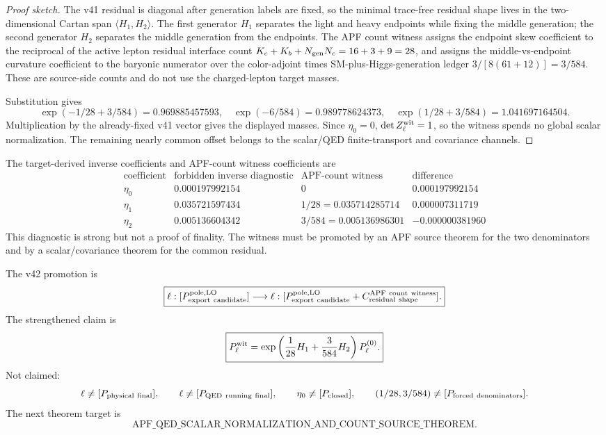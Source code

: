 \begin{proof}[Proof sketch]
The v41 residual is diagonal after generation labels are fixed, so the minimal trace-free residual shape lives in the two-dimensional Cartan span \(\langle H_1,H_2\rangle\).  The first generator \(H_1\) separates the light and heavy endpoints while fixing the middle generation; the second generator \(H_2\) separates the middle generation from the endpoints.  The APF count witness assigns the endpoint skew coefficient to the reciprocal of the active lepton residual interface count \(K_c+K_b+N_{\rm gen}N_c=16+3+9=28\), and assigns the middle-vs-endpoint curvature coefficient to the baryonic numerator over the color-adjoint times SM-plus-Higgs-generation ledger \(3/[8(61+12)]=3/584\).  These are source-side counts and do not use the charged-lepton target masses.

Substitution gives
\[
  \exp(-1/28+3/584)=0.969885457593,
  \quad
  \exp(-6/584)=0.989778624373,
  \quad
  \exp(1/28+3/584)=1.041697164504.
\]
Multiplication by the already-fixed v41 vector gives the displayed masses.  Since \(\eta_0=0\), \(\det Z_\ell^{\rm wit}=1\), so the witness spends no global scalar normalization.  The remaining nearly common offset belongs to the scalar/QED finite-transport and covariance channels.
\end{proof}

\begin{diagnostic}\label{diag:inverse-vs-witness-v42}
The target-derived inverse coefficients and APF-count witness coefficients are
\[
\begin{array}{c|c|c|c}
\text{coefficient} & \text{forbidden inverse diagnostic} & \text{APF-count witness} & \text{difference}\\ \hline
\eta_0 & 0.000197992154 & 0 & 0.000197992154\\
\eta_1 & 0.035721597434 & 1/28=0.035714285714 & 0.000007311719\\
\eta_2 & 0.005136604342 & 3/584=0.005136986301 & -0.000000381960
\end{array}
\]
This diagnostic is strong but not a proof of finality.  The witness must be promoted by an APF source theorem for the two denominators and by a scalar/covariance theorem for the common residual.
\end{diagnostic}

\begin{statusbox}
The v42 promotion is
\[
  \boxed{
  \ell:[P_{\rm export\ candidate}^{\rm pole,LO}]
  \longrightarrow
  \ell:[P_{\rm export\ candidate}^{\rm pole,LO}+C_{\rm residual\ shape}^{\rm APF\ count\ witness}].}
\]
The strengthened claim is
\[
  \boxed{
  P_\ell^{\rm wit}
  =\exp\left({1\over28}H_1+{3\over584}H_2\right)
  P_\ell^{(0)}.}
\]
Not claimed:
\[
  \ell\neq[P_{\rm physical\ final}],\qquad
  \ell\neq[P_{\rm QED\ running\ final}],\qquad
  \eta_0\neq[P_{\rm closed}],\qquad
  (1/28,3/584)\neq[P_{\rm forced\ denominators}].
\]
The next theorem target is
\[
  \boxed{\text{APF\_QED\_SCALAR\_NORMALIZATION\_AND\_COUNT\_SOURCE\_THEOREM}.}
\]
\end{statusbox}
